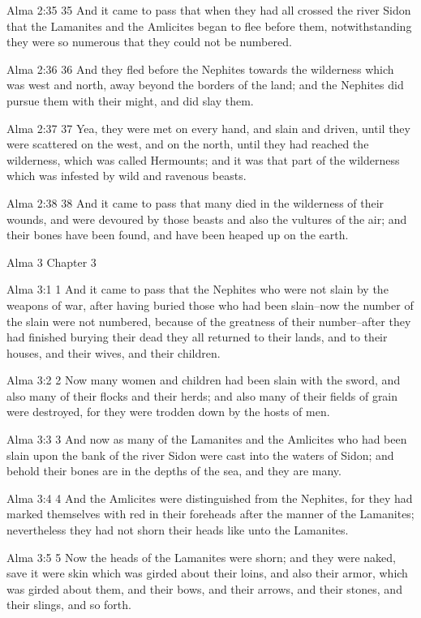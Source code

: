 Alma 2:35
 35 And it came to pass that when they had all crossed the river
Sidon that the Lamanites and the Amlicites began to flee before
them, notwithstanding they were so numerous that they could not
be numbered.

Alma 2:36
 36 And they fled before the Nephites towards the wilderness
which was west and north, away beyond the borders of the land;
and the Nephites did pursue them with their might, and did slay
them.

Alma 2:37
 37 Yea, they were met on every hand, and slain and driven, until
they were scattered on the west, and on the north, until they had
reached the wilderness, which was called Hermounts; and it was
that part of the wilderness which was infested by wild and
ravenous beasts.

Alma 2:38
 38 And it came to pass that many died in the wilderness of their
wounds, and were devoured by those beasts and also the vultures
of the air; and their bones have been found, and have been heaped
up on the earth.

Alma 3
Chapter 3

Alma 3:1
 1 And it came to pass that the Nephites who were not slain by
the weapons of war, after having buried those who had been
slain--now the number of the slain were not numbered, because of
the greatness of their number--after they had finished burying
their dead they all returned to their lands, and to their houses,
and their wives, and their children.

Alma 3:2
 2 Now many women and children had been slain with the sword, and
also many of their flocks and their herds; and also many of their
fields of grain were destroyed, for they were trodden down by the
hosts of men.

Alma 3:3
 3 And now as many of the Lamanites and the Amlicites who had
been slain upon the bank of the river Sidon were cast into the
waters of Sidon; and behold their bones are in the depths of the
sea, and they are many.

Alma 3:4
 4 And the Amlicites were distinguished from the Nephites, for
they had marked themselves with red in their foreheads after the
manner of the Lamanites; nevertheless they had not shorn their
heads like unto the Lamanites.

Alma 3:5
 5 Now the heads of the Lamanites were shorn; and they were
naked, save it were skin which was girded about their loins, and
also their armor, which was girded about them, and their bows,
and their arrows, and their stones, and their slings, and so
forth.

